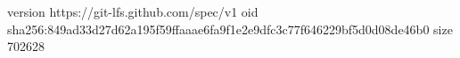 version https://git-lfs.github.com/spec/v1
oid sha256:849ad33d27d62a195f59ffaaae6fa9f1e2e9dfc3c77f646229bf5d0d08de46b0
size 702628
